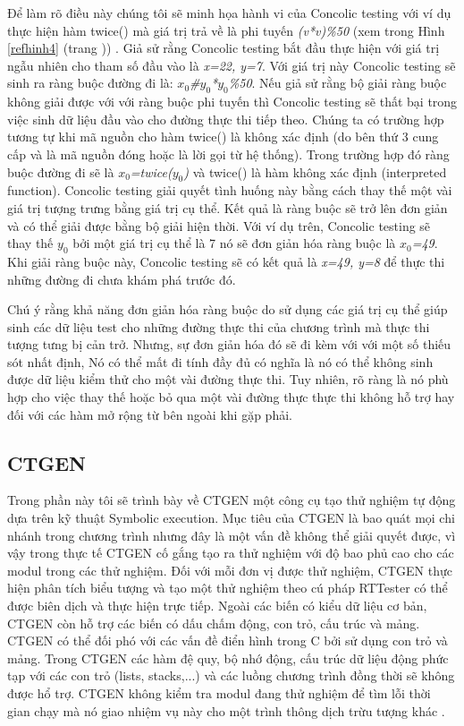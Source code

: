 \documentclass[12pt,a4paper]{article}
\begin{document}
\begin{enumerate}
Để làm rõ điều này chúng tôi sẽ minh họa hành vi của Concolic testing với ví dụ thực hiện hàm twice() mà giá trị trả về là phi tuyến \textit{(v*v)\%50} (xem trong Hình \ref{refhinh4} (trang \pageref{refhinh4})) . Giả sử rằng Concolic testing bắt đầu thực hiện với giá trị ngẫu nhiên cho tham số đầu vào là \textit{{x=22, y=7}}. Với giá trị này Concolic testing sẽ sinh ra ràng buộc đường đi là:  \textit{$x_0$\#$y_0$*$y_0$\%50}. Nếu giả sử rằng bộ giải ràng buộc không giải được với với ràng buộc phi tuyến thì Concolic testing sẽ thất bại trong việc sinh dữ liệu đầu vào cho đường thực thi tiếp theo. Chúng ta có trường hợp tương tự khi mã nguồn cho hàm twice() là không xác định (do bên thứ 3 cung cấp và là mã nguồn đóng hoặc là lời gọi từ hệ thống). Trong trường hợp đó ràng buộc đường đi sẽ là \textit{$x_0$=twice($y_0$)} và twice() là hàm không xác định (interpreted function). Concolic testing giải quyết tình huống này bằng cách thay thế một vài giá trị tượng trưng bằng giá trị cụ thể. Kết quả là ràng buộc sẽ trở lên đơn giản và có thể giải được bằng bộ giải hiện thời. Với ví dụ trên, Concolic testing sẽ thay thế \textit{$y_0$} bởi một giá trị cụ thể là 7 nó sẽ đơn giản hóa ràng buộc là \textit{$x_0$=49}. Khi giải ràng buộc này, Concolic testing sẽ có kết quả là \textit{{x=49, y=8}} để thực thi những đường đi chưa khám phá trước đó.

Chú ý rằng khả năng đơn giản hóa ràng buộc do sử dụng các giá trị cụ thể giúp sinh các dữ liệu test cho những đường thực thi của chương trình mà thực thi tượng tưng bị cản trở. Nhưng, sự đơn giản hóa đó sẽ đi kèm với với một số thiếu sót nhất định, Nó có thể mất đi tính đầy đủ có nghĩa là nó có thể không sinh được dữ liệu kiểm thử cho một vài đường thực thi. Tuy nhiên, rõ ràng là nó phù hợp cho việc thay thế hoặc bỏ qua một vài đường thực thực thi không hỗ trợ hay đối với các hàm mở rộng từ bên ngoài khi gặp phải.

\end{enumerate}

\subsection{CTGEN}
Trong phần này tôi sẽ trình bày về CTGEN một công cụ tạo thử nghiệm tự động dựa trên kỹ thuật Symbolic execution. Mục tiêu của CTGEN là bao quát mọi chi nhánh trong chương trình nhưng đây là một vấn đề không thể giải quyết được, vì vậy trong thực tế CTGEN cố gắng tạo ra thử nghiệm với độ bao phủ cao cho các modul trong các thử nghiệm. Đối với mỗi đơn vị được thử nghiệm, CTGEN thực hiện phân tích biểu tượng và tạo một thử nghiệm theo cú pháp RTTester \cite{mollerverified} có thể được biên dịch và thực hiện trực tiếp. Ngoài các biến có kiểu dữ liệu cơ bản, CTGEN còn hỗ trợ các biến có dấu chấm động, con trỏ, cấu trúc và mảng. CTGEN có thể đối phó với các vấn đề điển hình trong C bởi sử dụng con trỏ và mảng. Trong CTGEN các hàm đệ quy, bộ nhớ động, cấu trúc dữ liệu động phức tạp với các con trỏ (lists, stacks,...) và các luồng chương trình đồng thời sẽ không được hổ trợ. CTGEN không kiểm tra modul đang thử nghiệm để tìm lỗi thời gian chạy mà nó giao nhiệm vụ này cho một trình thông dịch trừu tượng khác \cite{peleska2011automated}.
\end{document}

